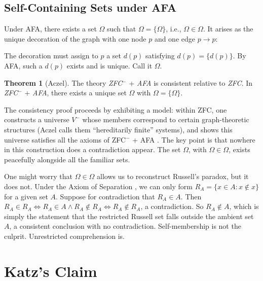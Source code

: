 \documentclass[12pt]{article}
\theoremstyle{definition}
\newtheorem{theorem}{Theorem}
\begin{document}
\subsection{Self-Containing Sets under AFA}

Under AFA, there exists a set $\Omega$ such that $\Omega = \{\Omega\}$, i.e., $\Omega \in \Omega$. It arises as the unique decoration of the graph with one node $p$ and one edge $p \to p$:

\begin{center}
\end{center}

The decoration must assign to $p$ a set $d(p)$ satisfying $d(p) = \{d(p)\}$. By AFA, such a $d(p)$ exists and is unique. Call it $\Omega$.

\begin{theorem}[Aczel]
The theory \emph{ZFC}$^-$ + \emph{AFA} is consistent relative to \emph{ZFC}. In \emph{ZFC}$^-$ + \emph{AFA}, there exists a unique set $\Omega$ with $\Omega = \{\Omega\}$.
\end{theorem}

The consistency proof proceeds by exhibiting a model: within ZFC, one constructs a universe $V^-$ whose members correspond to certain graph-theoretic structures (Aczel calls them ``hereditarily finite'' systems), and shows this universe satisfies all the axioms of ZFC$^-$ + AFA \cite{aczel}. The key point is that nowhere in this construction does a contradiction appear. The set $\Omega$, with $\Omega \in \Omega$, exists peacefully alongside all the familiar sets.

One might worry that $\Omega \in \Omega$ allows us to reconstruct Russell's paradox, but it does not. Under the Axiom of Separation \cite{zermelo_1908}, we can only form $R_A = \{x \in A : x \notin x\}$ for a given set $A$. Suppose for contradiction that $R_A \in A$. Then $R_A \in R_A \iff R_A \in A \wedge R_A \notin R_A \iff R_A \notin R_A$, a contradiction. So $R_A \notin A$, which is simply the statement that the restricted Russell set falls outside the ambient set $A$, a consistent conclusion with no contradiction. Self-membership is not the culprit. Unrestricted comprehension is.

\section{Katz's Claim}
\end{document}
